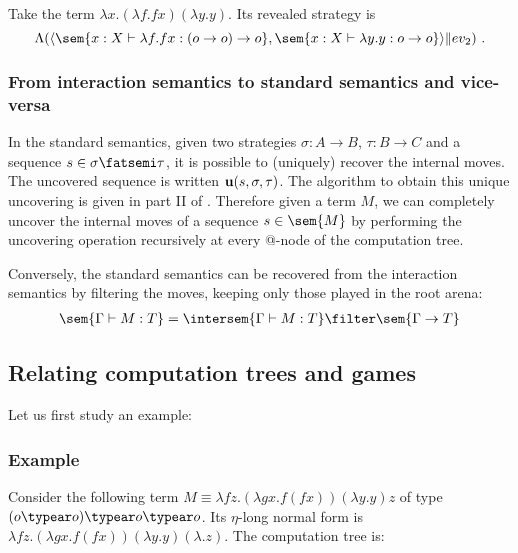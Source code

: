 \begin{example}
Take the term $\lambda x . (\lambda f . f x) (\lambda y . y)$.
Its revealed strategy is $$\Lambda ( \langle \sem{ x:X \vdash \lambda f . f
x : (o\rightarrow o) \rightarrow o} , \sem{ x:X \vdash \lambda y . y
: o \rightarrow o} \rangle \| ev_2 ) \ .$$
\end{example}


\subsubsection{From interaction semantics to standard semantics and vice-versa}

In the standard semantics, given two strategies $\sigma : A
\rightarrow B$, $\tau : B \rightarrow C$ and a sequence $s \in
\sigma \fatsemi \tau$, it is possible to (uniquely) recover the
internal moves. The uncovered sequence is written ${\bf u}(s,
\sigma, \tau)$. The algorithm to obtain this unique uncovering is
given in part II of \cite{hylandong_pcf}. Therefore given a term
$M$, we can completely uncover the internal moves of a sequence
$s\in\sem{M}$ by performing the uncovering operation recursively at
every @-node of the computation tree.

Conversely, the standard semantics can be recovered from the
interaction semantics by filtering the moves, keeping only those
played in the root arena:
\begin{eqnarray}
 \sem{\Gamma \vdash M : T} = \intersem{\Gamma \vdash M : T} \filter \sem{\Gamma \rightarrow T} \label{eqn:int_std_gamsem}
\end{eqnarray}




\subsection{Relating computation trees and games}
Let us first study an example:
\subsubsection{Example}
Consider the following term $M \equiv \lambda f z . (\lambda g x . f (f x)) (\lambda y. y) z$ of type $(o \typear o) \typear o \typear o$.
Its $\eta$-long normal form is $\lambda f z . (\lambda g x . f (f x)) (\lambda y. y) (\lambda .z)$.
The computation tree is:

